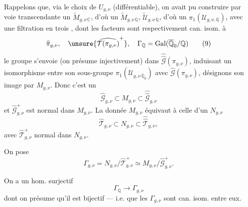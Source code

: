 
Rappelons que, via le choix de $U_{g,\nu}$ (différentiable), on avait pu construire par voie transcendante un $\widetilde M_{g,\nu\,\mathbb C}$, d'où un $\widetilde M_{g,\nu\,\mathbb Q}$,  $\widetilde{\mathcal U}_{g,\nu\,\mathbb Q}$, d'où un $\pi_1(\mathcal U_{g,\nu,\mathbb Q})$, avec une filtration en trois , dont les facteurs sont respectivement can. isom. à
\[
\widehat{\pi}_{g,\nu},\quad
\unsure{\widehat{\mathcal T(\pi_{g,\nu})}^{+}},\quad
\Gamma_{\mathbb Q}=\mathrm{Gal}(\overline{\mathbb Q}_0/\mathbb Q)
\tag{9}
\]
le groupe s'envoie (on présume injectivement) dans $\widehat{\widehat{\mathcal G}}(\pi_{g,\nu})$,  induisant un isomorphisme entre son sous-groupe $\pi_1(\mathcal U_{g,\nu\,\overline{\mathbb Q}_0})$ avec $\widehat{\mathcal G}(\pi_{g,\nu})$, désignons son image par $M_{g,\nu}$. Donc c'est un  
\[
\widehat{\mathcal G}_{g,\nu}\subset M_{g,\nu}\subset\widehat{\widehat{\mathcal G}}_{g,\nu}
\tag{10}
\]
et $\widehat{\mathcal G}_{g,\nu}^{+}$ est normal dans $M_{g,\nu}$. La donnée  $M_{g,\nu}$ équivaut à celle d'un $N_{g,\nu}$
\[
\widehat{\mathcal T}_{g,\nu}\subset N_{g,\nu}\subset\widehat{\widehat{\mathcal T}}_{g,\nu},
\tag{11}
\]
avec $\widehat{\mathcal T}_{g,\nu}^{+}$ normal dans $N_{g,\nu}$.

On pose
\[
\Gamma_{g,\nu}=N_{g,\nu}/\widehat{\mathcal T}_{g,\nu}^{+}\simeq M_{g,\nu}/\widehat{\mathcal G}_{g,\nu}^{+}.
\tag{12}
\]

On a un hom. surjectif
\[
\Gamma_{\mathbb Q}\longrightarrow\Gamma_{g,\nu}
\tag{13}
\]
dont on présume qu'il est bijectif --- i.e. que les $\Gamma_{g,\nu}$ sont can. isom. entre eux.


